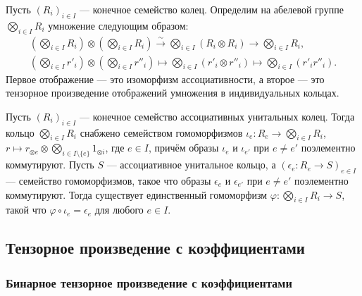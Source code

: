 \documentclass[
	extrafontsizes,
	11pt,
	hyphens,
]{memoir}
\begin{document}
\begin{definition}
Пусть \((R_i)_{i \in I}\) --- конечное семейство колец.
Определим на абелевой группе \(\bigotimes_{i \in I} R_i\) умножение следующим образом:
\begin{gather*}
\textstyle
(\bigotimes_{i \in I} R_i)
\otimes
(\bigotimes_{i \in I} R_i)
\xrightarrow{\sim}
\bigotimes_{i \in I} (R_i \otimes R_i)
\to
\bigotimes_{i \in I} R_i,
\\
\textstyle
(\bigotimes_{i \in I} r'_i)
\otimes
(\bigotimes_{i \in I} r''_i)
\mapsto
\bigotimes_{i \in I} (r'_i \otimes r''_i)
\mapsto
\bigotimes_{i \in I} (r'_i r''_i).
\end{gather*}
Первое отображение --- это изоморфизм ассоциативности, а второе --- это тензорное произведение отображений умножения в индивидуальных кольцах.
\end{definition}

\begin{statement}
Пусть \((R_i)_{i \in I}\) --- конечное семейство ассоциативных унитальных колец.
Тогда кольцо \(\bigotimes_{i \in I} R_i\) снабжено семейством гомоморфизмов
\(\iota_e : R_e \to \bigotimes_{i \in I} R_i\),
\(r \mapsto r_{\otimes e} \otimes \bigotimes_{i \in I \setminus \{e\}} 1_{\otimes i}\), где \(e \in I\),
причём образы \(\iota_e\) и \(\iota_{e'}\) при \(e \neq e'\) поэлементно коммутируют.
Пусть \(S\) --- ассоциативное унитальное кольцо, а \((\epsilon_e : R_e \to S)_{e \in I}\) --- семейство гомоморфизмов, такое что образы \(\epsilon_e\) и \(\epsilon_{e'}\) при \(e \neq e'\) поэлементно коммутируют.
Тогда существует единственный гомоморфизм \(\varphi : \bigotimes_{i \in I} R_i \to S\), такой что \(\varphi \circ \iota_e = \epsilon_e\) для любого \(e \in I\).
\end{statement}

\subsection{Тензорное произведение с коэффициентами}

\subsubsection{Бинарное тензорное произведение с коэффициентами}
\end{document}
